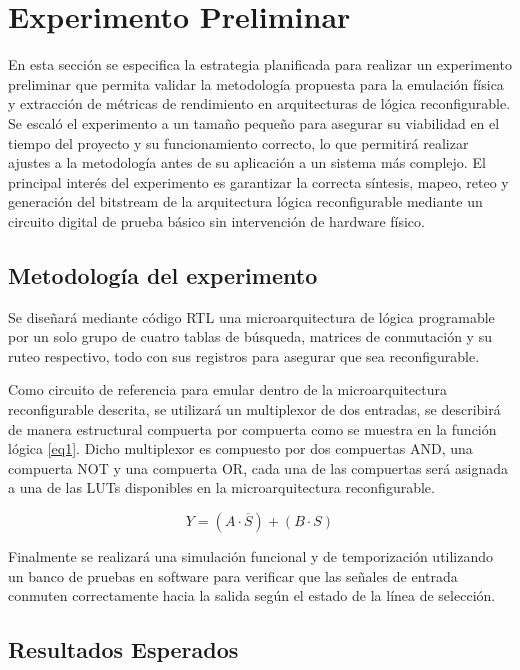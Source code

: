\chapter{Experimento Preliminar}
\label{ch:Experimento}

En esta sección se especifica la estrategia planificada para realizar un 
experimento preliminar que permita validar la metodología propuesta para 
la emulación física y extracción de métricas de rendimiento en 
arquitecturas de lógica reconfigurable. Se escaló el experimento a un 
tamaño pequeño para asegurar su viabilidad en el tiempo del proyecto y 
su funcionamiento correcto, lo que permitirá realizar ajustes a la 
metodología antes de su aplicación a un sistema más complejo. El 
principal interés del experimento es garantizar la correcta síntesis, 
mapeo, reteo y generación del bitstream de la arquitectura lógica 
reconfigurable mediante un circuito digital de prueba básico sin 
intervención de hardware físico.

\section{Metodología del experimento}

Se diseñará mediante código RTL una microarquitectura de lógica 
programable por un solo grupo de cuatro tablas de búsqueda, 
matrices de conmutación y su ruteo respectivo, todo con sus registros 
para asegurar que sea reconfigurable.

Como circuito de referencia para emular dentro de la microarquitectura 
reconfigurable descrita, se utilizará un multiplexor de dos entradas, 
se describirá de manera estructural compuerta por compuerta como se 
muestra en la función lógica \ref{eq1}. Dicho multiplexor es compuesto 
por dos compuertas AND, una compuerta NOT y una compuerta OR, cada una 
de las compuertas será asignada a una de las LUTs disponibles en la 
microarquitectura reconfigurable.

\begin{equation}
	\label{eq1}
	Y = (A \cdot \overline{S}) + (B \cdot S)
\end{equation}

Finalmente se realizará una simulación funcional y de temporización 
utilizando un banco de pruebas en software para verificar que las 
señales de entrada conmuten correctamente hacia la salida según el 
estado de la línea de selección.

\section{Resultados Esperados}

